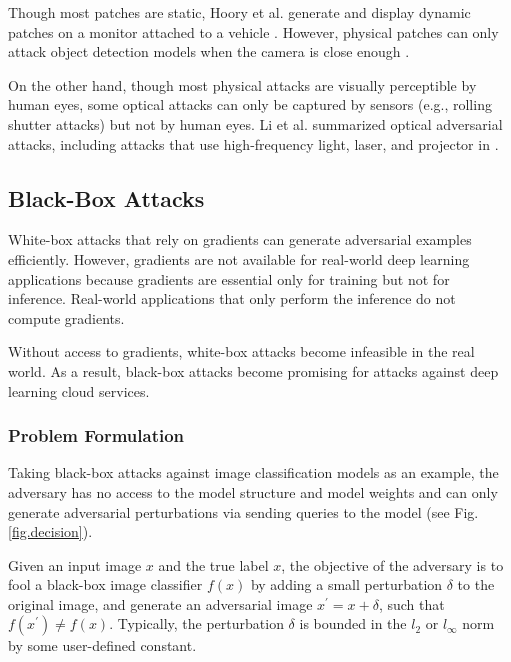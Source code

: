 Though most patches are static, Hoory et al. generate and display dynamic patches on a monitor attached to a vehicle \citep{hoory2020dynamic}. However, physical patches can only attack object detection models when the camera is close enough \citep{wang2021daedalus, lu2021scale}.

On the other hand, though most physical attacks are visually perceptible by human eyes, some optical attacks can only be captured by sensors (e.g., rolling shutter attacks) but not by human eyes. Li et al. summarized optical adversarial attacks, including attacks that use high-frequency light, laser, and projector in \citep{li2022survey}.



\subsection{Black-Box Attacks}
\label{sec:blackbox_attack}

White-box attacks that rely on gradients can generate adversarial examples efficiently. However, gradients are not available for real-world deep learning applications because gradients are essential only for training but not for inference. Real-world applications that only perform the inference do not compute gradients. 

Without access to gradients, white-box attacks become infeasible in the real world. As a result, black-box attacks become promising for attacks against deep learning cloud services.


\subsubsection{Problem Formulation}

Taking black-box attacks against image classification models as an example, the adversary has no access to the model structure and model weights and can only generate adversarial perturbations via sending queries to the model (see Fig. \ref{fig.decision}).
 
Given an input image $x$ and the true label $x$, the objective of the adversary is to fool a black-box image classifier $f(x)$ by adding a small perturbation $\delta$ to the original image, and generate an adversarial image $x^{'} = x + \delta$, such that $f(x^{'}) \neq f(x)$. Typically, the perturbation $\delta$ is bounded in the $l_2$ or $l_{\infty}$ norm by some user-defined constant.

